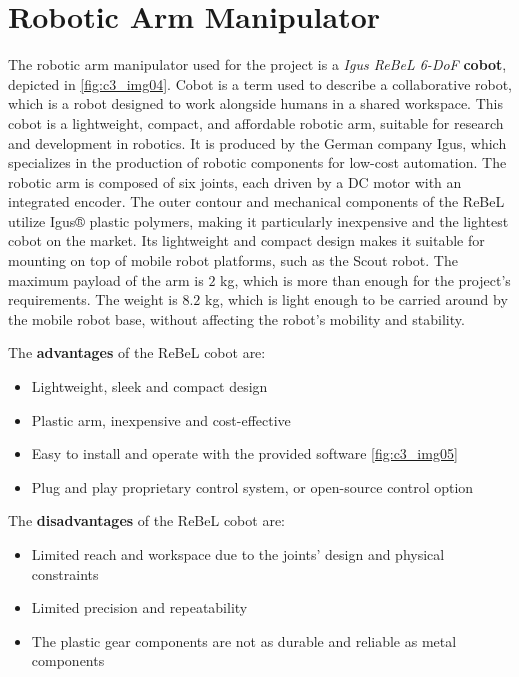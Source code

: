 \section{Robotic Arm Manipulator}

The robotic arm manipulator used for the project is a \textit{Igus ReBeL 6-DoF} \textbf{cobot}, depicted in \ref{fig:c3_img04}.
Cobot is a term used to describe a collaborative robot, which is a robot designed to work alongside humans in a shared workspace.
This cobot is a lightweight, compact, and affordable robotic arm, suitable for research and development
in robotics. It is produced by the German company Igus, which specializes in the production of robotic components
for low-cost automation. The robotic arm is composed of six joints, each driven by a DC motor with an integrated encoder.
The outer contour and mechanical components of the ReBeL utilize Igus® plastic polymers, making it particularly inexpensive
and the lightest cobot on the market. Its lightweight and compact design makes it suitable for mounting on top
of mobile robot platforms, such as the Scout robot. The maximum payload of the arm is $2$ kg, which is more than enough
for the project's requirements. The weight is $8.2$ kg, which is light enough to be carried around by the mobile robot base,
without affecting the robot's mobility and stability.

The \textbf{advantages} of the ReBeL cobot are:

\begin{itemize}
    \item Lightweight, sleek and compact design
    \item Plastic arm, inexpensive and cost-effective
    \item Easy to install and operate with the provided software \ref{fig:c3_img05}
    \item Plug and play proprietary control system, or open-source control option
\end{itemize}

The \textbf{disadvantages} of the ReBeL cobot are:
\begin{itemize}
    \item Limited reach and workspace due to the joints' design and physical constraints
    \item Limited precision and repeatability
    \item The plastic gear components are not as durable and reliable as metal components
\end{itemize}


